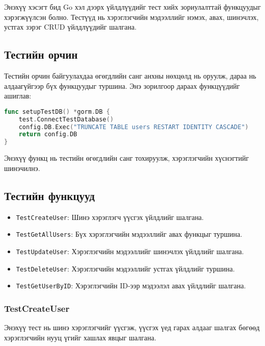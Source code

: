 Энэхүү хэсэгт бид Go хэл дээрх үйлдлүүдийг тест хийх зориулалттай функцуудыг хэрэгжүүлсэн болно. Тестүүд нь хэрэглэгчийн мэдээллийг нэмэх, авах, шинэчлэх, устгах зэрэг CRUD үйлдлүүдийг шалгана.

\subsection{Тестийн орчин}

Тестийн орчин байгуулахдаа өгөгдлийн санг анхны нөхцөлд нь оруулж, дараа нь алдаагүйгээр бүх функцуудыг туршина. Энэ зорилгоор дараах функцүүдийг ашиглав:

\begin{lstlisting}[language=Go, caption=Test Database Setup, frame=single]
func setupTestDB() *gorm.DB {
    test.ConnectTestDatabase()
    config.DB.Exec("TRUNCATE TABLE users RESTART IDENTITY CASCADE") 
    return config.DB
}
\end{lstlisting}

Энэхүү функц нь тестийн өгөгдлийн санг тохируулж, хэрэглэгчийн хүснэгтийг шинэчилнэ.

\subsection{Тестийн функцууд}

\begin{itemize}
    \item \texttt{TestCreateUser}: Шинэ хэрэглэгч үүсгэх үйлдлийг шалгана.
    \item \texttt{TestGetAllUsers}: Бүх хэрэглэгчийн мэдээллийг авах функцыг туршина.
    \item \texttt{TestUpdateUser}: Хэрэглэгчийн мэдээллийг шинэчлэх үйлдлийг шалгана.
    \item \texttt{TestDeleteUser}: Хэрэглэгчийн мэдээллийг устгах үйлдлийг туршина.
    \item \texttt{TestGetUserByID}: Хэрэглэгчийн ID-ээр мэдээлэл авах үйлдлийг шалгана.
\end{itemize}

\subsubsection{TestCreateUser}

Энэхүү тест нь шинэ хэрэглэгчийг үүсгэж, үүсгэх үед гарах алдааг шалгах бөгөөд хэрэглэгчийн нууц үгийг хашлах явцыг шалгана.

